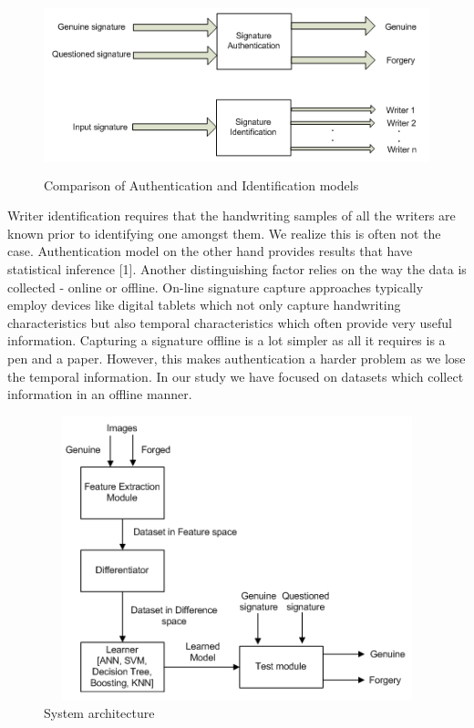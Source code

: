 \documentclass{article}
\begin{document}
\begin{figure}[h]
\begin{center}
\includegraphics[width=5in,height=2in]{BlockDiagram.PNG}
\end{center}
\caption{Comparison of Authentication and Identification models}
\end{figure}

Writer identification requires that the handwriting samples of all the writers are known prior to identifying one amongst them. We realize this is often not the case. Authentication model on the other hand provides results that have statistical inference [1]. Another distinguishing factor relies on the way the data is collected - online or offline. On-line signature capture approaches typically employ devices like digital tablets which not only capture handwriting characteristics but also temporal characteristics which often provide very useful information. Capturing a signature offline is a lot simpler as all it requires is a pen and a paper. However, this makes authentication a harder problem as we lose the temporal information. In our study we have focused on datasets which collect information in an offline manner.

\begin{figure}[h]
\begin{center}
\includegraphics[width=5in,height=3.25in]{ProjectDiagram.PNG}
\end{center}
\caption{System architecture}
\end{figure}
\end{document}
